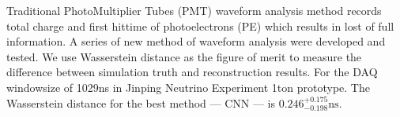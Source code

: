 Traditional PhotoMultiplier Tubes (PMT) waveform analysis method records total charge and first hittime of photoelectrons (PE) which results in lost of full information. A series of new method of waveform analysis were developed and tested. We use Wasserstein distance as the figure of merit to measure the difference between simulation truth and reconstruction results. For the DAQ windowsize of 1029ns in Jinping Neutrino Experiment 1ton prototype. The Wasserstein distance for the best method --- CNN --- is $0.246^{+0.175}_{-0.198}\mathrm{ns}$. 